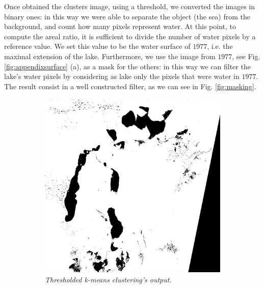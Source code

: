 Once obtained the clusters image, using a threshold, we converted the images in binary ones: in this way we were able to separate the object (the sea) from the background, and count how many pixels represent water. 
At this point, to compute the areal ratio, it is sufficient to divide the number of water pixels by a reference value. 
We set this value to be the water surface of $1977$, i.e. the maximal extension of the lake. 
Furthermore, we use the image from $1977$, see Fig. \ref{fig:appendixsurface} (a), as a mask for the others: in this way we can filter the lake's water pixels by considering as lake only the pixels that were water in $1977$.
The result consist in a well constructed filter, as we can see in Fig. \ref{fig:masking}.
\begin{figure}[H]
    \centering
    \begin{subfigure}[b]{.45\textwidth}
        \includegraphics[width=\textwidth]{../img/2015_with_noise.jpg}
        \caption{\emph{Thresholded k-means clustering's output.}}
    \end{subfigure}
    \begin{subfigure}[b]{.45\textwidth}

\end{subfigure}
\end{figure}
